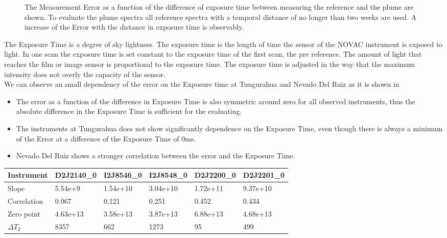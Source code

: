 \documentclass  [
  paper    = a4,
  BCOR     = 10mm,
  twoside,
  fontsize = 12pt,
  fleqn,
  toc      = bibnumbered,
  toc      = listofnumbered,
  numbers  = noendperiod,
  headings = normal,
  listof   = leveldown,
  version  = 3.03
]                                       {scrreprt}
\begin{document}
\begin{figure}
		\caption{The   Measurement Error as a function of the difference of exposure time between measuring the reference and the plume are shown. To evaluate the plume spectra all reference spectra with a temporal distance of no longer than two weeks are used. A increase of the   Error with the distance in exposure time is observably.}
		\label{fig:diffexptime}
	\end{figure}
	The Exposure Time is a degree of sky lightness. The  exposure time is the length of time the sensor of the NOVAC instrument is exposed to light. In one scan the exposure time is set constant to the exposure time of the first scan, the pre reference. The amount of light that reaches the film or image sensor is proportional to the exposure time. The exposure time is adjusted in the way that the maximum intensity does not overly the capacity of the sensor.\\
	We can observe an small dependency of the  error on the Exposure time at Tungurahua and Nevado Del Ruiz as it is shown in 
	\begin{itemize}
		\item The   error as a function of the difference in Exposure Time is also symmetric around zero for all observed instruments, thus the absolute difference in the Exposure Time is sufficient for the evaluating.
		\item The instruments at Tungurahua does not show significantly dependence on the Exposure Time, even though there is always a minimum of the   Error at a difference of the Exposure Time of 0ms.
		\item Nevado Del Ruiz shows a stronger correlation between the   error and the Exposure Time.
	\end{itemize}
	\begin{table}[h]
		\begin{tabular}{|p{2cm}|p{2cm}|p{2cm}|p{2cm}|p{2cm}|p{2cm}|}
			Instrument	&D2J2140\_0&I2J8546\_0& I2J8548\_0&D2J2200\_0&D2J2201\_0\\
			\toprule
			Slope& 5.54e+9&1.54e+10 &3.04e+10&1.72e+11&9.37e+10\\
			\midrule
			Correlation&0.067
			&0.121&
			0.251&
			0.452&
			0.434\\
			\midrule
			Zero point&4.63e+13&3.58e+13& 3.87e+13& 6.88e+13& 4.68e+13\\
						\midrule
			$\Delta T_{2}$&8357&662&1273&95&499\\
			\bottomrule
		\end{tabular}
	\end{table}
\end{document}

